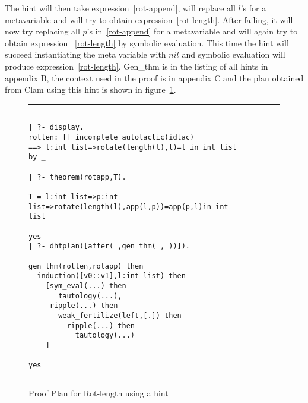         The hint will then take expression~\ref{rot-append}, will
replace all $l$'s for a metavariable and will try to obtain
expression~\ref{rot-length}. After failing, it will now try replacing
all $p$'s in~\ref{rot-append} for a metavariable and will again try to
obtain expression ~\ref{rot-length} by symbolic evaluation. This time
the hint will succeed instantiating the meta variable with $nil$ and
symbolic evaluation will produce expression~\ref{rot-length}. Gen\_thm
is in the listing of all hints in appendix B, the context used in the
proof is in appendix C and the plan obtained from Clam using this hint
is shown in figure~\ref{rot-plan}.


\begin{figure}[htb] \begin{center} %
\hrule
\begin{small}
\begin{verbatim}

| ?- display.
rotlen: [] incomplete autotactic(idtac)
==> l:int list=>rotate(length(l),l)=l in int list
by _

| ?- theorem(rotapp,T).

T = l:int list=>p:int list=>rotate(length(l),app(l,p))=app(p,l)in int
list

yes
| ?- dhtplan([after(_,gen_thm(_,_))]).

gen_thm(rotlen,rotapp) then
  induction([v0::v1],l:int list) then
    [sym_eval(...) then
       tautology(...),
     ripple(...) then
       weak_fertilize(left,[.]) then
         ripple(...) then
           tautology(...)
    ]

yes

\end{verbatim}
\end{small}
\end{center}
\caption{Proof Plan for Rot-length using a hint}
\label{rot-plan}
\hrule
\end{figure}


